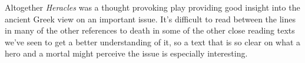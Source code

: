 \documentclass[letterpaper, reqno,11pt]{article}
\begin{document}
\medskip

Altogether {\em Heracles} was a thought provoking play providing good insight into the ancient Greek view on an important issue. It's difficult to read between the lines in many of the other references to death in some of the other close reading texts we've seen to get a better understanding of it, so a text that is so clear on what a hero and a mortal might perceive the issue is especially interesting.
\end{document}

